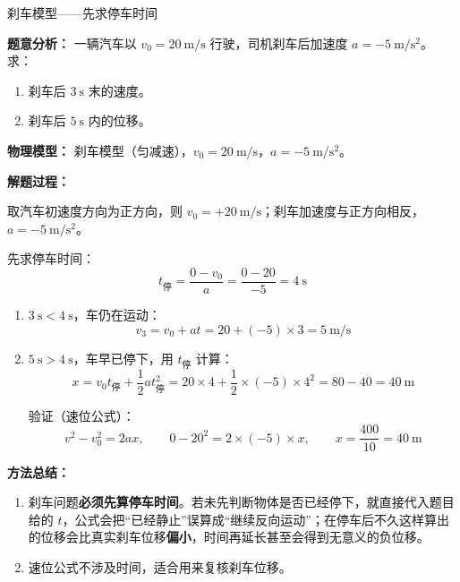 \begin{examplebox}{刹车模型——先求停车时间}

\textbf{题意分析：} 一辆汽车以 $v_0 = 20\ \mathrm{m/s}$ 行驶，司机刹车后加速度 $a = -5\ \mathrm{m/s^2}$。求：
\begin{enumerate}
  \item 刹车后 $3\ \mathrm{s}$ 末的速度。
  \item 刹车后 $5\ \mathrm{s}$ 内的位移。
\end{enumerate}

\textbf{物理模型：} 刹车模型（匀减速），$v_0 = 20\ \mathrm{m/s}$，$a = -5\ \mathrm{m/s^2}$。

\textbf{解题过程：}

取汽车初速度方向为正方向，则 $v_0=+20\ \mathrm{m/s}$；刹车加速度与正方向相反，$a=-5\ \mathrm{m/s^2}$。

先求停车时间：
\[
t_{\text{停}} = \frac{0 - v_0}{a} = \frac{0 - 20}{-5} = 4\ \mathrm{s}
\]

\begin{enumerate}
  \item $3\ \mathrm{s} < 4\ \mathrm{s}$，车仍在运动：
  \[
  v_3 = v_0 + a t = 20 + (-5) \times 3 = 5\ \mathrm{m/s}
  \]

  \item $5\ \mathrm{s} > 4\ \mathrm{s}$，车早已停下，用 $t_{\text{停}}$ 计算：
  \[
  x = v_0 t_{\text{停}} + \frac12 a t_{\text{停}}^2 = 20 \times 4 + \frac12 \times (-5) \times 4^2 = 80 - 40 = 40\ \mathrm{m}
  \]

  验证（速位公式）：
  \[
  v^2 - v_0^2 = 2ax,\qquad 0 - 20^2 = 2 \times (-5) \times x,\qquad x = \frac{400}{10} = 40\ \mathrm{m}
  \]
\end{enumerate}

\textbf{方法总结：}
\begin{enumerate}
  \item 刹车问题\textbf{必须先算停车时间}。若未先判断物体是否已经停下，就直接代入题目给的 $t$，公式会把“已经静止”误算成“继续反向运动”；在停车后不久这样算出的位移会比真实刹车位移\textbf{偏小}，时间再延长甚至会得到无意义的负位移。
  \item 速位公式不涉及时间，适合用来复核刹车位移。
\end{enumerate}

\end{examplebox}

